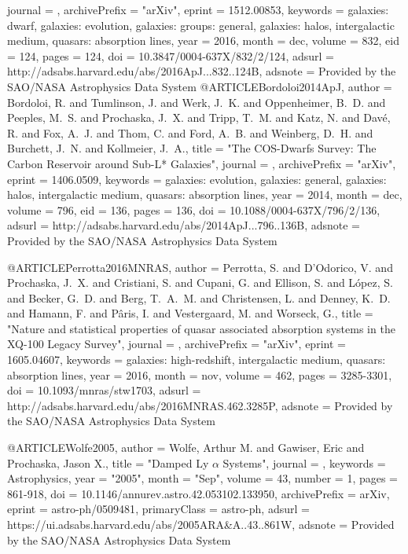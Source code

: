 \documentclass{aa}
\begin{document}
{{{{{{{{{{{{{{{  journal = {\apj},
archivePrefix = "arXiv",
   eprint = {1512.00853},
 keywords = {galaxies: dwarf, galaxies: evolution, galaxies: groups: general, galaxies: halos, intergalactic medium, quasars: absorption lines},
     year = 2016,
    month = dec,
   volume = 832,
      eid = {124},
    pages = {124},
      doi = {10.3847/0004-637X/832/2/124},
   adsurl = {http://adsabs.harvard.edu/abs/2016ApJ...832..124B},
  adsnote = {Provided by the SAO/NASA Astrophysics Data System}
}
@ARTICLE{Bordoloi2014ApJ,
   author = {{Bordoloi}, R. and {Tumlinson}, J. and {Werk}, J.~K. and {Oppenheimer}, B.~D. and 
	{Peeples}, M.~S. and {Prochaska}, J.~X. and {Tripp}, T.~M. and 
	{Katz}, N. and {Dav{\'e}}, R. and {Fox}, A.~J. and {Thom}, C. and 
	{Ford}, A.~B. and {Weinberg}, D.~H. and {Burchett}, J.~N. and 
	{Kollmeier}, J.~A.},
    title = "{The COS-Dwarfs Survey: The Carbon Reservoir around Sub-L* Galaxies}",
  journal = {\apj},
archivePrefix = "arXiv",
   eprint = {1406.0509},
 keywords = {galaxies: evolution, galaxies: general, galaxies: halos, intergalactic medium, quasars: absorption lines},
     year = 2014,
    month = dec,
   volume = 796,
      eid = {136},
    pages = {136},
      doi = {10.1088/0004-637X/796/2/136},
   adsurl = {http://adsabs.harvard.edu/abs/2014ApJ...796..136B},
  adsnote = {Provided by the SAO/NASA Astrophysics Data System}
}

@ARTICLE{Perrotta2016MNRAS,
   author = {{Perrotta}, S. and {D'Odorico}, V. and {Prochaska}, J.~X. and 
	{Cristiani}, S. and {Cupani}, G. and {Ellison}, S. and {L{\'o}pez}, S. and 
	{Becker}, G.~D. and {Berg}, T.~A.~M. and {Christensen}, L. and 
	{Denney}, K.~D. and {Hamann}, F. and {P{\^a}ris}, I. and {Vestergaard}, M. and 
	{Worseck}, G.},
    title = "{Nature and statistical properties of quasar associated absorption systems in the XQ-100 Legacy Survey}",
  journal = {\mnras},
archivePrefix = "arXiv",
   eprint = {1605.04607},
 keywords = {galaxies: high-redshift, intergalactic medium, quasars: absorption lines},
     year = 2016,
    month = nov,
   volume = 462,
    pages = {3285-3301},
      doi = {10.1093/mnras/stw1703},
   adsurl = {http://adsabs.harvard.edu/abs/2016MNRAS.462.3285P},
  adsnote = {Provided by the SAO/NASA Astrophysics Data System}
}

@ARTICLE{Wolfe2005,
       author = {{Wolfe}, Arthur M. and {Gawiser}, Eric and {Prochaska}, Jason X.},
        title = "{Damped Ly {\ensuremath{\alpha}} Systems}",
      journal = {\araa},
     keywords = {Astrophysics},
         year = "2005",
        month = "Sep",
       volume = {43},
       number = {1},
        pages = {861-918},
          doi = {10.1146/annurev.astro.42.053102.133950},
archivePrefix = {arXiv},
       eprint = {astro-ph/0509481},
 primaryClass = {astro-ph},
       adsurl = {https://ui.adsabs.harvard.edu/abs/2005ARA&A..43..861W},
      adsnote = {Provided by the SAO/NASA Astrophysics Data System}
}

}}}}}}}}}}}}}}
\end{document}
